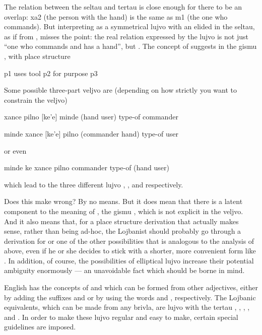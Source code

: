 The relation between the seltau and tertau is close enough
    for there to be an overlap: xa2 (the person with the hand) is
    the same as m1 (the one who commands). But interpreting
     as a symmetrical lujvo with an elided  in
    the seltau, as if from , misses the point:
    the real relation expressed by the lujvo is not just ``one who
    commands and has a hand'', but .
    The concept of  suggests in the gismu , with
    place structure
\begin{example}
p1 uses tool p2 for purpose p3
\end{example}

Some possible three-part veljvo are (depending on how
    strictly you want to constrain the veljvo)
\begin{example}
 xance pilno [ke'e] minde\n
(hand user) type-of commander
\end{example}

\begin{example}
[ke] minde xance [ke'e] pilno\n
(commander hand) type-of user
\end{example}

{\noindent}or even
\begin{example}
minde ke xance pilno \n
commander type-of (hand user)
\end{example}

{\noindent}which lead to the three different lujvo ,
    , and  respectively. 

Does this make  wrong? By no means. But it does
    mean that there is a latent component to the meaning of
    , the gismu , which is not explicit in the
    veljvo. And it also means that, for a place structure
    derivation that actually makes sense, rather than being ad-hoc,
    the Lojbanist should probably go through a derivation for
     or one of the other possibilities that is
    analogous to the analysis of  above, even if
    he or she decides to stick with a shorter, more convenient form
    like . In addition, of course, the possibilities of
    elliptical lujvo increase their potential ambiguity enormously
    --- an unavoidable fact which should be borne in mind.



English has the concepts of  and
     which can be formed from other
    adjectives, either by adding the suffixes  and 
    or by using the words  and , respectively. The
    Lojbanic equivalents, which can be made from any brivla, are
    lujvo with the tertau , , ,
    , and . In order to make these lujvo regular
    and easy to make, certain special guidelines are imposed.

